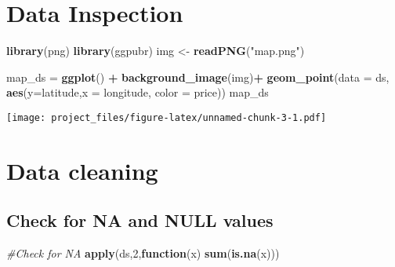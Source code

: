 \documentclass[
]{article}
\newenvironment{Shaded}{\begin{snugshade}}{\end{snugshade}}
\newcommand{\CommentTok}[1]{\textcolor[rgb]{0.56,0.35,0.01}{\textit{#1}}}
\newcommand{\ControlFlowTok}[1]{\textcolor[rgb]{0.13,0.29,0.53}{\textbf{#1}}}
\newcommand{\DataTypeTok}[1]{\textcolor[rgb]{0.13,0.29,0.53}{#1}}
\newcommand{\DecValTok}[1]{\textcolor[rgb]{0.00,0.00,0.81}{#1}}
\newcommand{\KeywordTok}[1]{\textcolor[rgb]{0.13,0.29,0.53}{\textbf{#1}}}
\newcommand{\NormalTok}[1]{#1}
\newcommand{\OperatorTok}[1]{\textcolor[rgb]{0.81,0.36,0.00}{\textbf{#1}}}
\newcommand{\StringTok}[1]{\textcolor[rgb]{0.31,0.60,0.02}{#1}}
\begin{document}
\hypertarget{data-inspection}{%
\section{Data Inspection}\label{data-inspection}}

\begin{Shaded}
\begin{Highlighting}[]
\KeywordTok{library}\NormalTok{(png)}
\KeywordTok{library}\NormalTok{(ggpubr)}
\NormalTok{img <-}\StringTok{ }\KeywordTok{readPNG}\NormalTok{(}\StringTok{"map.png"}\NormalTok{)}
   

\NormalTok{map_ds =}\StringTok{ }\KeywordTok{ggplot}\NormalTok{() }\OperatorTok{+}\StringTok{ }\KeywordTok{background_image}\NormalTok{(img)}\OperatorTok{+}\StringTok{ }\KeywordTok{geom_point}\NormalTok{(}\DataTypeTok{data =}\NormalTok{ ds,  }\KeywordTok{aes}\NormalTok{(}\DataTypeTok{y=}\NormalTok{latitude,}\DataTypeTok{x =}\NormalTok{ longitude, }\DataTypeTok{color =}\NormalTok{ price)) }
\NormalTok{map_ds}
\end{Highlighting}
\end{Shaded}

\texttt{[image: project\_files/figure-latex/unnamed-chunk-3-1.pdf]}

\hypertarget{data-cleaning}{%
\section{Data cleaning}\label{data-cleaning}}

\hypertarget{check-for-na-and-null-values}{%
\subsection{Check for NA and NULL
values}\label{check-for-na-and-null-values}}

\begin{Shaded}
\begin{Highlighting}[]
\CommentTok{#Check for NA}
\KeywordTok{apply}\NormalTok{(ds,}\DecValTok{2}\NormalTok{,}\ControlFlowTok{function}\NormalTok{(x) }\KeywordTok{sum}\NormalTok{(}\KeywordTok{is.na}\NormalTok{(x)))}
\end{Highlighting}
\end{Shaded}
\end{document}

